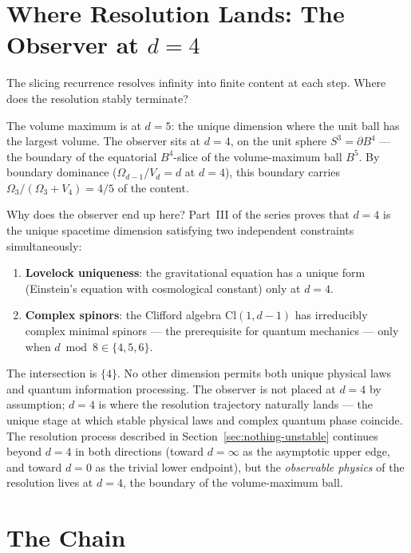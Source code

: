 \documentclass[11pt,a4paper]{article}
\begin{document}
\section{Where Resolution Lands: The Observer at \texorpdfstring{$d=4$}{d=4}}\label{sec:where-resolution-lands-the-observer-at-d4}

The slicing recurrence resolves infinity into finite content at each
step. Where does the resolution stably terminate?

The volume maximum is at $d = 5$: the unique dimension where the unit
ball has the largest volume. The observer sits at $d = 4$, on the unit
sphere $S^3 = \partial B^4$ --- the boundary of the equatorial $B^4$-slice
of the volume-maximum ball $B^5$. By boundary dominance
($\Omega_{d-1}/V_d = d$ at $d=4$), this boundary carries
$\Omega_3/(\Omega_3+V_4)=4/5$ of the content.

Why does the observer end up here? Part~III of the series proves
that $d = 4$ is the unique spacetime dimension satisfying two
independent constraints simultaneously:

\begin{enumerate}
\item \textbf{Lovelock uniqueness}: the gravitational equation has a
unique form (Einstein's equation with cosmological constant) only at
$d = 4$.
\item \textbf{Complex spinors}: the Clifford algebra
$\mathrm{Cl}(1,d-1)$ has irreducibly complex minimal spinors --- the
prerequisite for quantum mechanics --- only when
$d\bmod 8\in\{4,5,6\}$.
\end{enumerate}

The intersection is $\{4\}$. No other dimension permits both unique
physical laws and quantum information processing. The observer is not
placed at $d = 4$ by assumption; $d = 4$ is where the resolution
trajectory naturally lands --- the unique stage at which stable
physical laws and complex quantum phase coincide. The resolution
process described in Section~\ref{sec:nothing-unstable} continues
beyond $d=4$ in both directions (toward $d=\infty$ as the asymptotic
upper edge, and toward $d=0$ as the trivial lower endpoint), but the
\emph{observable physics} of the resolution lives at $d=4$, the
boundary of the volume-maximum ball.

\section{The Chain}\label{sec:the-chain}
\end{document}

